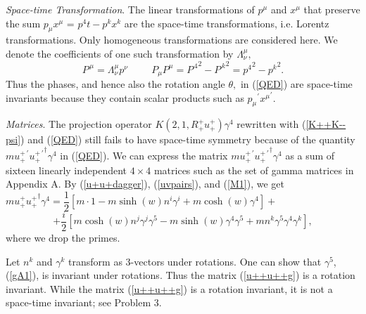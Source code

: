 \documentclass[a4paper,12pt]{article}
\begin{document}
	{\textit{Space-time Transformation}}. The linear transformations of $p^{\mu}$ and $x^{\mu}$ that preserve the sum $p_{\mu} x^{\mu}$ = ${p^{4}}t - {p^{k}}x^{k}$ are the space-time transformations, i.e. Lorentz transformations. Only homogeneous transformations are considered here. We denote the coefficients of one such transformation by $\Lambda_{\nu}^{\mu},$
\begin{equation}	\label{lambda}
 P^{\, \mu} = \Lambda_{\nu}^{\mu} p^{\nu} \hspace{1cm} P_{\mu}P^{\mu} = {P^{\,4}}^{2} - {P^{\, k}}^{2}  = {p^{4}}^{2} - {p^{k}}^{2} .
 \end{equation}
Thus the phases, and hence also the rotation angle $\theta,$ in (\ref{QED}) are space-time invariants because they contain scalar products such as ${p_{\mu}}^{\prime}{x^{\mu}}^{\prime}.$ 

	{\textit{Matrices}}. The projection operator $K(2,1,R_{+}^{+} u_{+}^{+}) \gamma^{4}$ rewritten with (\ref{K++K--psi}) and (\ref{QED}) still fails to have space-time symmetry because of the quantity $m u_{+}^{+ \, \prime} {u_{+}^{+ \, \prime }}^{\dagger} \gamma^{4}$ in (\ref{QED}). We can express the matrix $m u_{+}^{+ \, \prime} {u_{+}^{+ \, \prime }}^{\dagger} \gamma^{4}$ as a sum of sixteen linearly independent $4 \times 4$ matrices such as the set of gamma matrices in Appendix A. By (\ref{u+u+dagger}), (\ref{uvpairs}), and (\ref{M1}), we get 
\begin{equation}	\label{u++u++g}
m u_{+}^{+ } {u_{+}^{+  }}^{\dagger} \gamma^{4} = \frac{1}{2}[m \cdot 1 - m \sinh{(w)} n^{i} \gamma^{i} + m\cosh{(w)} \gamma^{4}] + \hspace{4cm}
\end{equation}
$$+\frac{i}{2}[ m\cosh{(w)} n^{j} \gamma^{j} \gamma^{5} - m \sinh{(w)}\gamma^{4} \gamma^{5} + m n^{k} \gamma^{5} \gamma^{4} \gamma^{k}],$$
where we drop the primes. 

	Let $n^{k}$ and $\gamma^{k}$ transform as 3-vectors under rotations. One can show that $\gamma^{5}$, (\ref{gA1}), is invariant under rotations. Thus the matrix (\ref{u++u++g}) is a rotation invariant. While the matrix (\ref{u++u++g}) is a rotation invariant, it is not a space-time invariant; see Problem 3.
\end{document}
